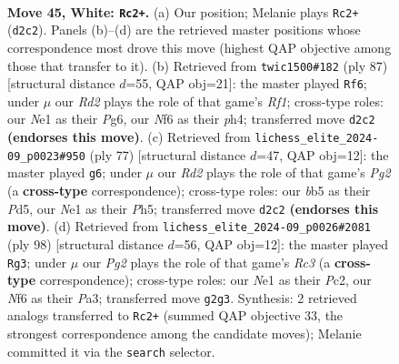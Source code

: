 \documentclass[11pt]{article}
\begin{document}
\clearpage

\begin{figure}[p]\centering
\begin{subfigure}{0.46\textwidth}\centering
\resizebox{\linewidth}{!}{%
\newchessgame
\chessboard[
  setfen={5r2/5B2/2k2N2/1b2rp2/1P5R/8/3R2P1/3KN3 w - - 5 45},
  showmover=false,
  pgfstyle=straightmove, color=movearrow, markmove={d2-c2}
]}
\caption{}
\end{subfigure}\hfill
\begin{subfigure}{0.46\textwidth}\centering
\resizebox{\linewidth}{!}{%
\newchessgame
\chessboard[
  setfen={5r2/6k1/1R4p1/5p2/7P/5Br1/2K2R2/8 b - - 3 44},
  showmover=false,
  pgfstyle=straightmove, color=movearrow, markmove={f8-f6}
]}
\caption{}
\end{subfigure}
\\[4pt]
\begin{subfigure}{0.46\textwidth}\centering
\resizebox{\linewidth}{!}{%
\newchessgame
\chessboard[
  setfen={8/2R3p1/1p1r1k2/1P1pn2p/4n3/8/1P4B1/5K2 b - - 3 39},
  showmover=false,
  pgfstyle=straightmove, color=movearrow, markmove={g7-g6}
]}
\caption{}
\end{subfigure}\hfill
\begin{subfigure}{0.46\textwidth}\centering
\resizebox{\linewidth}{!}{%
\newchessgame
\chessboard[
  setfen={5r1k/7p/5P2/p6P/4r1N1/P1R5/2P5/K7 w - - 1 50},
  showmover=false,
  pgfstyle=straightmove, color=movearrow, markmove={c3-g3}
]}
\caption{}
\end{subfigure}
\caption{\textbf{Move 45, White: \texttt{Rc2+}.} (a) Our position; Melanie plays \texttt{Rc2+} (\texttt{d2c2}). Panels (b)--(d) are the retrieved master positions whose correspondence most drove this move (highest QAP objective among those that transfer to it). (b) Retrieved from \texttt{twic1500\#182} (ply 87) [structural distance $d$=55, QAP obj=21]: the master played \texttt{Rf6}; under $\mu$ our \emph{Rd2} plays the role of that game's \emph{Rf1}; cross-type roles: our \emph{N}e1 as their \emph{P}g6, our \emph{N}f6 as their \emph{p}h4; transferred move \texttt{d2c2} \textbf{(endorses this move)}. (c) Retrieved from \texttt{lichess\_elite\_2024-09\_p0023\#950} (ply 77) [structural distance $d$=47, QAP obj=12]: the master played \texttt{g6}; under $\mu$ our \emph{Rd2} plays the role of that game's \emph{Pg2} (a \textbf{cross-type} correspondence); cross-type roles: our \emph{b}b5 as their \emph{P}d5, our \emph{N}e1 as their \emph{P}h5; transferred move \texttt{d2c2} \textbf{(endorses this move)}. (d) Retrieved from \texttt{lichess\_elite\_2024-09\_p0026\#2081} (ply 98) [structural distance $d$=56, QAP obj=12]: the master played \texttt{Rg3}; under $\mu$ our \emph{Pg2} plays the role of that game's \emph{Rc3} (a \textbf{cross-type} correspondence); cross-type roles: our \emph{N}e1 as their \emph{P}c2, our \emph{N}f6 as their \emph{P}a3; transferred move \texttt{g2g3}. Synthesis: 2 retrieved analogs transferred to \texttt{Rc2+} (summed QAP objective 33, the strongest correspondence among the candidate moves); Melanie committed it via the \texttt{search} selector.}
\label{fig:thought-m88}
\end{figure}
\end{document}
